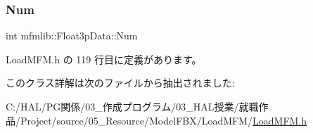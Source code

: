 \subsubsection{\texorpdfstring{Num}{Num}}
{\footnotesize\ttfamily int mfmlib\+::\+Float3p\+Data\+::\+Num}



 Load\+M\+F\+M.\+h の 119 行目に定義があります。



このクラス詳解は次のファイルから抽出されました\+:\begin{DoxyCompactItemize}
\item 
C\+:/\+H\+A\+L/\+P\+G関係/03\+\_\+作成プログラム/03\+\_\+\+H\+A\+L授業/就職作品/\+Project/source/05\+\_\+\+Resource/\+Model\+F\+B\+X/\+Load\+M\+F\+M/\mbox{\hyperlink{_load_m_f_m_8h}{Load\+M\+F\+M.\+h}}\end{DoxyCompactItemize}
